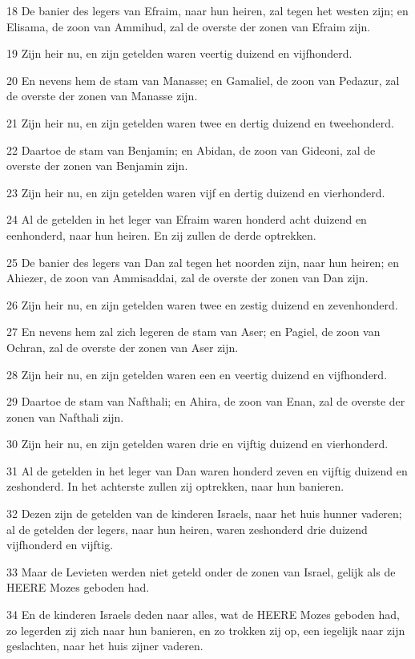 \par 18 De banier des legers van Efraim, naar hun heiren, zal tegen het westen zijn; en Elisama, de zoon van Ammihud, zal de overste der zonen van Efraim zijn.
\par 19 Zijn heir nu, en zijn getelden waren veertig duizend en vijfhonderd.
\par 20 En nevens hem de stam van Manasse; en Gamaliel, de zoon van Pedazur, zal de overste der zonen van Manasse zijn.
\par 21 Zijn heir nu, en zijn getelden waren twee en dertig duizend en tweehonderd.
\par 22 Daartoe de stam van Benjamin; en Abidan, de zoon van Gideoni, zal de overste der zonen van Benjamin zijn.
\par 23 Zijn heir nu, en zijn getelden waren vijf en dertig duizend en vierhonderd.
\par 24 Al de getelden in het leger van Efraim waren honderd acht duizend en eenhonderd, naar hun heiren. En zij zullen de derde optrekken.
\par 25 De banier des legers van Dan zal tegen het noorden zijn, naar hun heiren; en Ahiezer, de zoon van Ammisaddai, zal de overste der zonen van Dan zijn.
\par 26 Zijn heir nu, en zijn getelden waren twee en zestig duizend en zevenhonderd.
\par 27 En nevens hem zal zich legeren de stam van Aser; en Pagiel, de zoon van Ochran, zal de overste der zonen van Aser zijn.
\par 28 Zijn heir nu, en zijn getelden waren een en veertig duizend en vijfhonderd.
\par 29 Daartoe de stam van Nafthali; en Ahira, de zoon van Enan, zal de overste der zonen van Nafthali zijn.
\par 30 Zijn heir nu, en zijn getelden waren drie en vijftig duizend en vierhonderd.
\par 31 Al de getelden in het leger van Dan waren honderd zeven en vijftig duizend en zeshonderd. In het achterste zullen zij optrekken, naar hun banieren.
\par 32 Dezen zijn de getelden van de kinderen Israels, naar het huis hunner vaderen; al de getelden der legers, naar hun heiren, waren zeshonderd drie duizend vijfhonderd en vijftig.
\par 33 Maar de Levieten werden niet geteld onder de zonen van Israel, gelijk als de HEERE Mozes geboden had.
\par 34 En de kinderen Israels deden naar alles, wat de HEERE Mozes geboden had, zo legerden zij zich naar hun banieren, en zo trokken zij op, een iegelijk naar zijn geslachten, naar het huis zijner vaderen.

